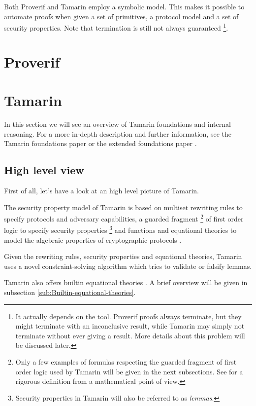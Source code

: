 Both Proverif and Tamarin employ a symbolic model. This makes it possible to automate proofs when given a set of primitives, a protocol model and a set of security properties. Note that termination is still not always guaranteed \footnote{It actually depends on the tool. Proverif proofs always terminate, but they might terminate with an inconclusive result, while Tamarin may simply not terminate without ever giving a result. More details about this problem will be discussed later.}. %

\section{Proverif}

\section{Tamarin}
In this section we will see an overview of Tamarin foundations and internal reasoning.
For a more in-depth description and further information, see the Tamarin foundations paper \cite{TamarinFoundations} or the extended foundations paper \cite{TamarinFoundationsExtended}.

\subsection{High level view}
First of all, let's have a look at an high level picture of Tamarin.

The security property model of Tamarin is based on multiset rewriting rules to specify protocols and adversary capabilities, a guarded fragment \footnote{Only a few examples of formulas respecting the guarded fragment of first order logic used by Tamarin will be given in the next subsections. See \cite{FragmentFirstOrderLogicPaper} for a rigorous definition from a mathematical point of view.} of first order logic to specify security properties \footnote{Security properties in Tamarin will also be referred to as \textit{lemmas}.} and functions and equational theories to model the algebraic properties of cryptographic protocols \cite{TamarinFoundations}. %

Given the rewriting rules, security properties and equational theories, Tamarin uses a novel constraint-solving algorithm which tries to validate or falsify lemmas.

Tamarin also offers builtin equational theories \cite{TamarinProverManual}. A brief overview will be given in subsection \ref{sub:Builtin-equational-theories}.

